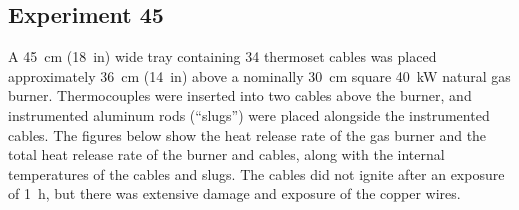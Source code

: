 \documentclass[12pt]{article}
\begin{document}
\subsection{Experiment 45}

A 45~cm (18~in) wide tray containing 34 thermoset cables was placed approximately 36~cm (14~in) above a nominally 30~cm square 40~kW natural gas burner. Thermocouples were inserted into two cables above the burner, and instrumented aluminum rods (``slugs'') were placed alongside the instrumented cables. The figures below show the heat release rate of the gas burner and the total heat release rate of the burner and cables, along with the internal temperatures of the cables and slugs. The cables did not ignite after an exposure of 1~h, but there was extensive damage and exposure of the copper wires.
\end{document}
